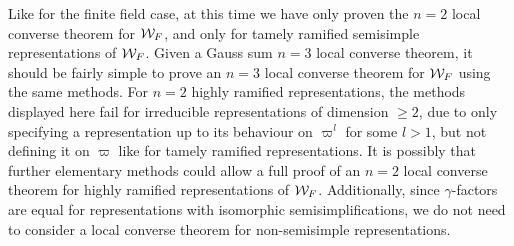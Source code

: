 Like for the finite field case, at this time we have only proven the $n=2$ local converse theorem for $\mathcal{W}_F$, and only for tamely ramified semisimple representations of $\mathcal{W}_F$.
Given a Gauss sum $n=3$ local converse theorem, it should be fairly simple to prove an $n=3$ local converse theorem for $\mathcal{W}_F$ using the same methods.
For $n=2$ highly ramified representations, the methods displayed here fail for irreducible representations of dimension $\geq 2$, due to only specifying a representation up to its behaviour on $\varpi^l$ for some $l > 1$, but not defining it on $\varpi$ like for tamely ramified representations.
It is possibly that further elementary methods could allow a full proof of an $n=2$ local converse theorem for highly ramified representations of $\mathcal{W}_F$.
Additionally, since $\gamma$-factors are equal for representations with isomorphic semisimplifications, we do not need to consider a local converse theorem for non-semisimple representations.
\\
\endinput
